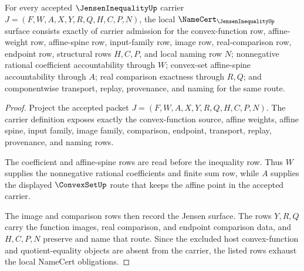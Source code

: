 \begin{theorem}
\label{thm:jensen-inequality-namecert-obligations}
For every accepted $\JensenInequalityUp$ carrier $J=(F,W,A,X,Y,R,Q,H,C,P,N)$, the local $\NameCert_{\JensenInequalityUp}$ surface consists exactly of carrier admission for the convex-function row, affine-weight row, affine-spine row, input-family row, image row, real-comparison row, endpoint row, structural rows $H,C,P$, and local naming row $N$; nonnegative rational coefficient accountability through $W$; convex-set affine-spine accountability through $A$; real comparison exactness through $R,Q$; and componentwise transport, replay, provenance, and naming for the same route.
\end{theorem}
\begin{proof}
Project the accepted packet $J=(F,W,A,X,Y,R,Q,H,C,P,N)$. The carrier definition exposes exactly the convex-function source, affine weights, affine spine, input family, image family, comparison, endpoint, transport, replay, provenance, and naming rows.

The coefficient and affine-spine rows are read before the inequality row. Thus $W$ supplies the nonnegative rational coefficients and finite sum row, while $A$ supplies the displayed $\ConvexSetUp$ route that keeps the affine point in the accepted carrier.

The image and comparison rows then record the Jensen surface. The rows $Y,R,Q$ carry the function images, real comparison, and endpoint comparison data, and $H,C,P,N$ preserve and name that route. Since the excluded host convex-function and quotient-equality objects are absent from the carrier, the listed rows exhaust the local NameCert obligations.
\end{proof}

